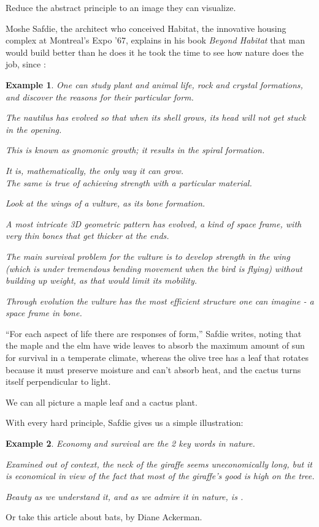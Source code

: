 \documentclass{book}
\numberwithin{equation}{section}
\newtheorem{example}{Example}[chapter]
\begin{document}
Reduce the abstract principle to an image they can visualize.

Moshe Safdie, the architect who conceived Habitat, the innovative housing complex at Montreal's Expo '67, explains in his book \textit{Beyond Habitat} that man would build better than he does it he took the time to see how nature does the job, since :
\begin{example}
    One can study plant and animal life, rock and crystal formations, and discover the reasons for their particular form.
    
    The nautilus has evolved so that when its shell grows, its head will not get stuck in the opening.
    
    This is known as gnomonic growth; it results in the spiral formation.
    
    It is, mathematically, the only way it can grow.\\
    
    The same is true of achieving strength with a particular material.
    
    Look at the wings of a vulture, as its bone formation.
    
    A most intricate 3D geometric pattern has evolved, a kind of space frame, with very thin bones that get thicker at the ends.
    
    The main survival problem for the vulture is to develop strength in the wing (which is under tremendous bending movement when the bird is flying) without building up weight, as that would limit its mobility.
    
    Through evolution the vulture has the most efficient structure one can imagine - a space frame in bone.
\end{example}
``For each aspect of life there are responses of form,'' Safdie writes, noting that the maple and the elm have wide leaves to absorb the maximum amount of sun for survival in a temperate climate, whereas the olive tree has a leaf that rotates because it must preserve moisture and can't absorb heat, and the cactus turns itself perpendicular to light.

We can all picture a maple leaf and a cactus plant.

With every hard principle, Safdie gives us a simple illustration:
\begin{example}
    Economy and survival are the 2 key words in nature.
    
    Examined out of context, the neck of the giraffe seems uneconomically long, but it is economical in view of the fact that most of the giraffe's good is high on the tree.
    
    \textit{Beauty as we understand it, and as we admire it in nature, is }.
\end{example}
Or take this article about bats, by Diane Ackerman.
\end{document}
